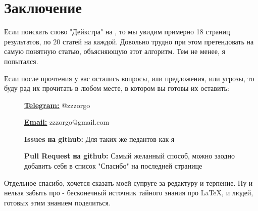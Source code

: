 \setlength{\headwidth}{145mm}
\vspace*{\fill}
\section*{Заключение}

Если поискать слово "Дейкстра" на , то мы увидим примерно 18 страниц результатов, по 20 статей на каждой. Довольно трудно при этом претендовать на самую понятную статью, объясняющую этот алгоритм. Тем не менее, я попытался.

Если после прочтения у вас остались вопросы, или предложения, или угрозы, то буду рад их прочитать в любом месте, в котором вы готовы их оставить:

\begin{description}
    \item[]{\href{https://t.me/zzzorgo}{\bfseries \ul{Telegram:}} @zzzorgo}
    \item[]{\href{mailto:zzzorgo@gmail.com}{\bfseries \ul{Email:}} zzzorgo@gmail.com}
    \item[]{
        {\bfseries Issues на github:} Для таких же педантов как я
    }
    \item[]{
        {\bfseries Pull Request на github:} Самый желанный способ, можно заодно добавить себя в список "Спасибо" на последней странице
    }
\end{description}

Отдельное спасибо, хочется сказать моей супруге за редактуру и терпение. Ну и нельзя забыть про  - бесконечный источник тайного знания про \LaTeX, и людей, готовых этим знанием поделиться.

\vspace*{\fill}
\restoregeometry
\clearpage

